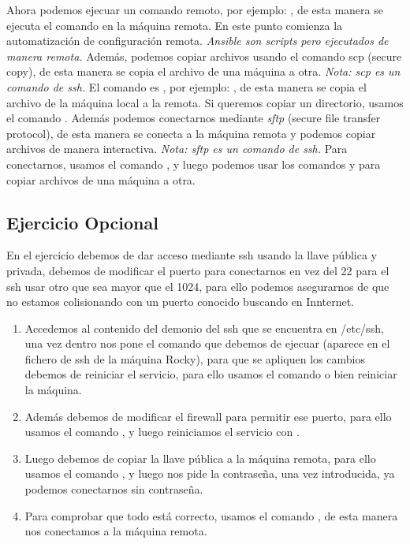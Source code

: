 Ahora podemos ejecuar un comando remoto, por ejemplo: , de esta manera se ejecuta el comando en la máquina remota. En este punto comienza la automatización de configuración remota. \textit{Ansible son scripts pero ejecutados de manera remota.} Además, podemos copiar archivos usando el comando scp (secure copy), de esta manera se copia el archivo de una máquina a otra. \textit{Nota: scp es un comando de ssh.} El comando es , por ejemplo: , de esta manera se copia el archivo de la máquina local a la remota. Si queremos copiar un directorio, usamos el comando . Además podemos conectarnos mediante \textit{sftp} (secure file transfer protocol), de esta manera se conecta a la máquina remota y podemos copiar archivos de manera interactiva. \textit{Nota: sftp es un comando de ssh.} Para conectarnos, usamos el comando , y luego podemos usar los comandos  y  para copiar archivos de una máquina a otra.

\subsection{Ejercicio Opcional}

En el ejercicio debemos de dar acceso mediante ssh usando la llave pública y privada, debemos de modificar el puerto para conectarnos en vez del 22 para el ssh usar otro que sea mayor que el 1024, para ello podemos asegurarnos de que no estamos colisionando con un puerto conocido buscando en Innternet.

\begin{enumerate}
    \item Accedemos al contenido del demonio del ssh que se encuentra en /etc/ssh, una vez dentro nos pone el comando que debemos de ejecuar  (aparece en el fichero de ssh de la máquina Rocky), para que se apliquen los cambios debemos de reiniciar el servicio, para ello usamos el comando  o bien reiniciar la máquina.
    \item Además debemos de modificar el firewall para permitir ese puerto, para ello usamos el comando , y luego reiniciamos el servicio con .
    \item Luego debemos de copiar la llave pública a la máquina remota, para ello usamos el comando , y luego nos pide la contraseña, una vez introducida, ya podemos conectarnos sin contraseña.
    \item Para comprobar que todo está correcto, usamos el comando , de esta manera nos conectamos a la máquina remota.
\end{enumerate}

